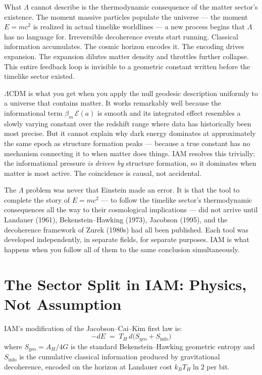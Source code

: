 \documentclass[12pt]{article}
\begin{document}
What $\Lambda$ cannot describe is the thermodynamic consequence of the
matter sector's existence. The moment massive particles populate the
universe — the moment $E = mc^2$ is realized in actual timelike
worldlines — a new process begins that $\Lambda$ has no language for.
Irreversible decoherence events start running. Classical information
accumulates. The cosmic horizon encodes it. The encoding drives
expansion. The expansion dilutes matter density and throttles further
collapse. This entire feedback loop is invisible to a geometric constant
written before the timelike sector existed.

\begin{notebox}
\noindent$\Lambda$CDM is what you get when you apply the null geodesic
description uniformly to a universe that contains matter. It works
remarkably well because the informational term $\beta_m\,\mathcal{E}(a)$
is smooth and its integrated effect resembles a slowly varying
constant over the redshift range where data has historically been most
precise. But it cannot explain why dark energy dominates at
approximately the same epoch as structure formation peaks — because a
true constant has no mechanism connecting it to when matter does
things. IAM resolves this trivially: the informational pressure
\textit{is driven by} structure formation, so it dominates when matter
is most active. The coincidence is causal, not accidental.
\end{notebox}

The $\Lambda$ problem was never that Einstein made an error. It is that
the tool to complete the story of $E = mc^2$ — to follow the timelike
sector's thermodynamic consequences all the way to their cosmological
implications — did not arrive until Landauer (1961), Bekenstein--Hawking
(1973), Jacobson (1995), and the decoherence framework of Zurek (1980s)
had all been published. Each tool was developed independently, in
separate fields, for separate purposes. IAM is what happens when you
follow all of them to the same conclusion simultaneously.


\section{The Sector Split in IAM: Physics, Not Assumption}

IAM's modification of the Jacobson--Cai--Kim first law is:
\begin{equation}
-dE \;=\; T_H\,d\bigl(S_\mathrm{geo} + S_\mathrm{info}\bigr)
\end{equation}
where $S_\mathrm{geo} = A_H/4G$ is the standard Bekenstein--Hawking
geometric entropy and $S_\mathrm{info}$ is the cumulative classical
information produced by gravitational decoherence, encoded on the
horizon at Landauer cost $k_B T_H \ln 2$ per bit.
\end{document}
